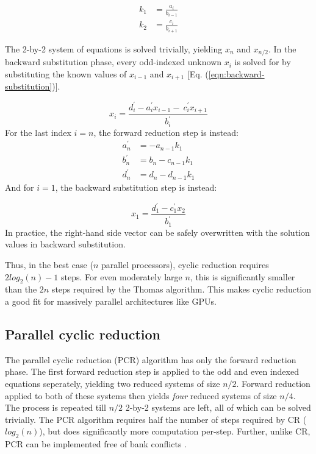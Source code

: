 \begin{align}
    k_1 &= \frac{a_i}{b_{i-1}} \label{eqn:k1-update} \\
    k_2 &= \frac{c_i}{b_{i+1}} \label{eqn:k2-update}
\end{align}

The 2-by-2 system of equations is solved trivially,
yielding $x_n$ and $x_{n/2}$.
In the backward substitution phase,
every odd-indexed unknown $x_i$ is solved for by
substituting the known values of $x_{i-1}$ and $x_{i+1}$
[Eq. (\ref{eqn:backward-substitution})].

\begin{equation} \label{eqn:backward-substitution}
x_i = \frac{d^{\prime}_i - a^{\prime}_ix_{i-1} - \
    c^{\prime}_ix_{i+1}}{b^{\prime}_i}
\end{equation}
%
For the last index $i=n$,
the forward reduction step is instead:
\begin{align} \label{eqn:forward-reduction-last}
    a^{\prime}_n &= -a_{n-1}k_1  \\
    b^{\prime}_n &= b_n - c_{n-1}k_1  \\
    d^{\prime}_n &= d_n - d_{n-1}k_1
\end{align}
%
And for $i=1$, the backward substitution step is instead:

\begin{equation} \label{eqn:backward-substitution-first}
x_1 = \frac{d^{\prime}_1 - c^{\prime}_1x_{2}}{b^{\prime}_1}
\end{equation}
%
In practice, the right-hand side vector can be safely
overwritten with the solution values
in backward substitution.

Thus, in the best case ($n$ parallel processors),
cyclic reduction requires 
$2log_2(n) - 1$ steps.
For even moderately large $n$,
this is significantly smaller than
the $2n$ steps required by the Thomas algorithm.
This makes cyclic reduction a good fit
for massively parallel architectures like GPUs.

\subsection{Parallel cyclic reduction}

The parallel cyclic reduction (PCR) algorithm
has only the forward reduction phase.
The first forward reduction step is applied to
the odd and even indexed equations seperately,
yielding two reduced systems
of size $n/2$.
Forward reduction applied to both of these
systems then yields \emph{four} reduced
systems of size $n/4$.
The process is repeated till
$n/2$ 2-by-2 systems are left,
all of which can be solved trivially.
The PCR algorithm requires half the number of steps
required by CR ($log_2(n)$),
but does significantly more computation per-step.
Further, unlike CR,
PCR can be implemented free of bank conflicts
\cite{Zhang2010FTS}.

